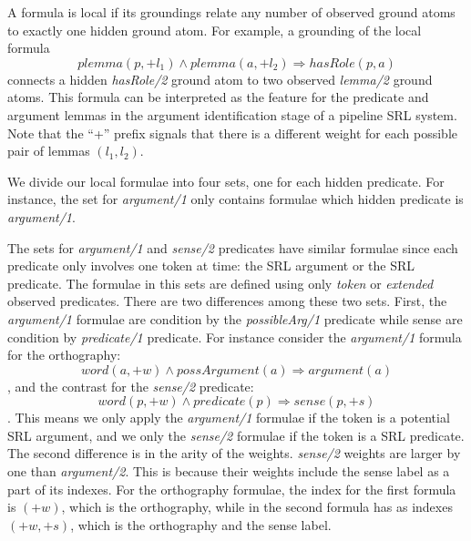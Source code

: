 
A formula is local if its groundings relate any number of observed ground atoms 
to exactly one hidden ground atom.  For example, a grounding of the local 
formula \[plemma(p,+l_1) \wedge plemma(a,+l_2) \Rightarrow hasRole(p,a)\]
connects a hidden \emph{hasRole/2} ground atom to two observed \emph{lemma/2} 
ground atoms. This formula can be interpreted as the feature for the predicate 
and argument lemmas in the argument identification stage of a pipeline SRL 
system.
Note that the ``+'' prefix signals that there is a different weight for each 
possible pair of lemmas $(l_1,l_2)$.

We divide our local formulae into four sets, one for each hidden predicate.  For 
instance, the set for \emph{argument/1} only contains formulae which hidden 
predicate is \emph{argument/1}. 

The sets for \emph{argument/1} and \emph{sense/2} predicates have similar 
formulae since each predicate only involves one token at time: the SRL argument 
or the SRL predicate. The formulae in this sets are defined using only 
\emph{token} or \emph{extended} observed predicates. There are two differences 
among these two sets.  First, the \emph{argument/1} formulae are condition by
the \emph{possibleArg/1} predicate while sense are condition by 
\emph{predicate/1} predicate. For instance consider the \emph{argument/1} 
formula for the orthography: \[word(a,+w) \land possArgument(a) \Rightarrow 
argument(a)\], and the contrast for the \emph{sense/2} predicate: \[word(p,+w) 
\land predicate(p) \Rightarrow sense(p,+s)\]. This means we only apply the 
\emph{argument/1} formulae if the token is a potential SRL argument, and we only 
the \emph{sense/2} formulae if the token is a SRL predicate. The second 
difference is in the arity of the weights. \emph{sense/2} weights are larger by 
one than \emph{argument/2}. This is because their weights include the sense 
label as a part of its indexes. For the orthography formulae, the index for the
first formula is $(+w)$, which is the orthography, while in the second formula 
has as indexes $(+w,+s)$, which is the orthography and the sense label.

